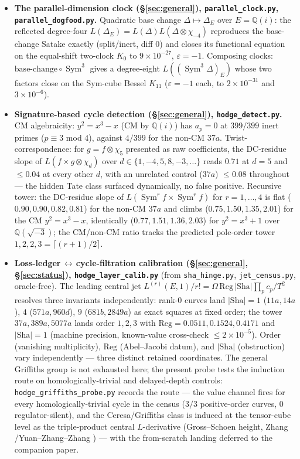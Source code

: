 \documentclass[11pt]{article}
\theoremstyle{definition}
\newcommand{\Sym}{\operatorname{Sym}}
\newcommand{\Sha}{\mathrm{Sha}}
\begin{document}
\begin{itemize}
\item \textbf{The parallel-dimension clock (\S\ref{sec:general}), \texttt{parallel\_clock.py},
\texttt{parallel\_dogfood.py}.} Quadratic base change $\Delta\mapsto\Delta_E$ over $E=\mathbb Q(i)$: the
reflected degree-four $L(\Delta_E)=L(\Delta)L(\Delta\otimes\chi_{-4})$ reproduces the base-change Satake
exactly (split/inert, diff $0$) and closes its functional equation on the equal-shift two-clock $K_0$ to
$9\times10^{-27}$, $\varepsilon=-1$. Composing clocks: $\mathrm{base\text{-}change}\circ\Sym^3$ gives a
degree-eight $L((\Sym^3\Delta)_E)$ whose two factors close on the Sym-cube Bessel $K_{11}$ ($\varepsilon=-1$
each, to $2\times10^{-31}$ and $3\times10^{-6}$).

\item \textbf{Signature-based cycle detection (\S\ref{sec:general}), \texttt{hodge\_detect.py}.} CM
algebraicity: $y^2=x^3-x$ (CM by $\mathbb Q(i)$) has $a_p=0$ at $399/399$ inert primes ($p\equiv3$ mod $4$),
against $4/399$ for the non-CM $37a$. Twist-correspondence: for $g=f\otimes\chi_5$ presented as raw
coefficients, the DC-residue slope of $L(f\times g\otimes\chi_d)$ over $d\in\{1,-4,5,8,-3,\dots\}$ reads
$0.71$ at $d=5$ and $\le0.04$ at every other $d$, with an unrelated control ($37a$) $\le0.08$ throughout ---
the hidden Tate class surfaced dynamically, no false positive. Recursive tower: the DC-residue slope of
$L(\Sym^r f\times\Sym^r f)$ for $r=1,\dots,4$ is flat ($0.90,0.90,0.82,0.81$) for the non-CM $37a$ and
climbs ($0.75,1.50,1.35,2.01$) for the CM $y^2=x^3-x$, identically ($0.77,1.51,1.36,2.03$) for
$y^2=x^3+1$ over $\mathbb Q(\sqrt{-3})$; the CM/non-CM ratio tracks the predicted pole-order tower
$1,2,2,3=\lceil(r{+}1)/2\rceil$.

\item \textbf{Loss-ledger\,$\leftrightarrow$\,cycle-filtration calibration (\S\ref{sec:general},
\S\ref{sec:status}), \texttt{hodge\_layer\_calib.py}} (from \texttt{sha\_hinge.py}, \texttt{jet\_census.py},
oracle-free). The leading central jet $L^{(r)}(E,1)/r!=\Omega\,\mathrm{Reg}\,|\Sha|\prod_p c_p/T^2$ resolves
three invariants independently: rank-$0$ curves land $|\Sha|=1$ ($11a,14a$), $4$ ($571a,960d$), $9$
($681b,2849a$) as exact squares at fixed order; the tower $37a,389a,5077a$ lands order $1,2,3$ with
$\mathrm{Reg}=0.0511,0.1524,0.4171$ and $|\Sha|=1$ (machine precision, known-value cross-check $\le
2\times10^{-5}$). Order (vanishing multiplicity), $\mathrm{Reg}$ (Abel--Jacobi datum), and $|\Sha|$
(obstruction) vary independently --- three distinct retained coordinates. The general Griffiths group is
not exhausted here; the present probe tests the induction route on homologically-trivial and delayed-depth
controls: \texttt{hodge\_griffiths\_probe.py} records the route
--- the value channel fires for every homologically-trivial cycle in the census ($3/3$ positive-order
curves, $0$ regulator-silent), and the Ceresa/Griffiths class is induced at the tensor-cube level as the
triple-product central $L$-derivative (Gross--Schoen height, Zhang \cite{ZhangGS}/Yuan--Zhang--Zhang
\cite{YZZ}) --- with the from-scratch landing deferred to the companion paper.


\end{itemize}
\end{document}
